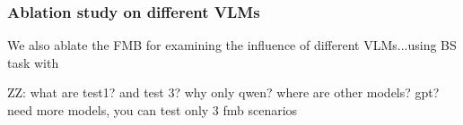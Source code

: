 \documentclass[letterpaper, 10 pt, conference]{ieeeconf}  %
\newcommand{\zz}[1]{{\color{red}ZZ: #1}}
\begin{document}
\subsubsection{Ablation study on different VLMs}
We also ablate the FMB for examining the influence of different VLMs...using BS task with 

\zz{what are test1? and test 3? why only qwen? where are other models? gpt? need more models, you can test only 3 fmb scenarios}





\end{document}
